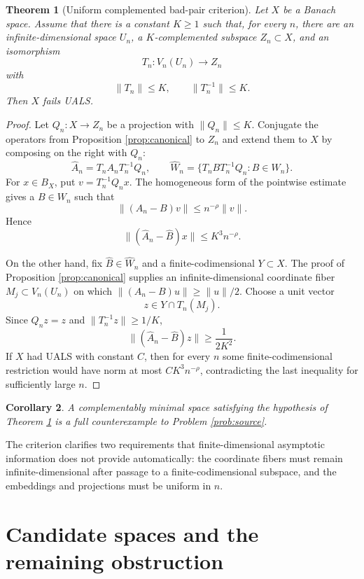 \documentclass[11pt]{article}
\newtheorem{theorem}{Theorem}[section]
\newtheorem{corollary}[theorem]{Corollary}
\theoremstyle{definition}
\theoremstyle{remark}
\begin{document}
\begin{theorem}[Uniform complemented bad-pair criterion]\label{thm:badpair}
Let $X$ be a Banach space.  Assume that there is a constant $K\geq1$ such that, for every $n$, there are an infinite-dimensional space $U_n$, a $K$-complemented subspace $Z_n\subset X$, and an isomorphism
\[
  T_n:V_n(U_n)\longrightarrow Z_n
\]
with
\[
  \|T_n\|\leq K,
  \qquad
  \|T_n^{-1}\|\leq K.
\]
Then $X$ fails UALS.
\end{theorem}

\begin{proof}
Let $Q_n:X\to Z_n$ be a projection with $\|Q_n\|\leq K$.  Conjugate the operators from Proposition \ref{prop:canonical} to $Z_n$ and extend them to $X$ by composing on the right with $Q_n$:
\[
  \widehat A_n=T_nA_nT_n^{-1}Q_n,
  \qquad
  \widehat W_n=
  \{T_nBT_n^{-1}Q_n:B\in W_n\}.
\]
For $x\in B_X$, put $v=T_n^{-1}Q_nx$.  The homogeneous form of the pointwise estimate gives a $B\in W_n$ such that
\[
  \|(A_n-B)v\|\leq n^{-\rho}\|v\|.
\]
Hence
\[
  \|(\widehat A_n-\widehat B)x\|
  \leq K^3n^{-\rho}.
\]

On the other hand, fix $\widehat B\in\widehat W_n$ and a finite-codimensional $Y\subset X$.  The proof of Proposition \ref{prop:canonical} supplies an infinite-dimensional coordinate fiber $M_j\subset V_n(U_n)$ on which $\|(A_n-B)u\|\geq\|u\|/2$.  Choose a unit vector
\[
  z\in Y\cap T_n(M_j).
\]
Since $Q_nz=z$ and $\|T_n^{-1}z\|\geq1/K$,
\[
  \|(\widehat A_n-\widehat B)z\|
  \geq \frac{1}{2K^2}.
\]
If $X$ had UALS with constant $C$, then for every $n$ some finite-codimensional restriction would have norm at most $CK^3n^{-\rho}$, contradicting the last inequality for sufficiently large $n$.
\end{proof}

\begin{corollary}\label{cor:target}
A complementably minimal space satisfying the hypothesis of Theorem \ref{thm:badpair} is a full counterexample to Problem \ref{prob:source}.
\end{corollary}

The criterion clarifies two requirements that finite-dimensional asymptotic information does not provide automatically: the coordinate fibers must remain infinite-dimensional after passage to a finite-codimensional subspace, and the embeddings and projections must be uniform in $n$.

\section{Candidate spaces and the remaining obstruction}
\end{document}
